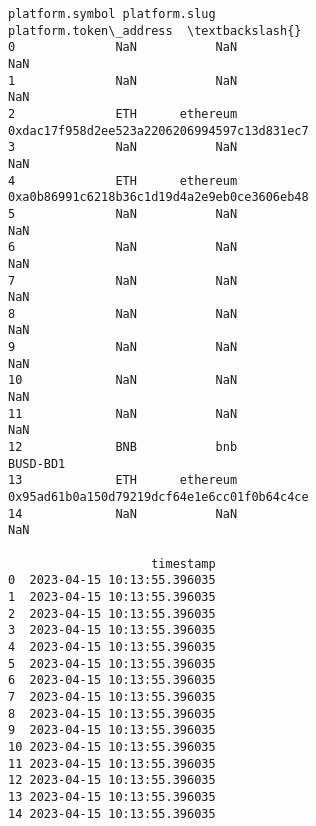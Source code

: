 \documentclass[11pt]{article}
\begin{document}
\begin{tcolorbox}[breakable, size=fbox, boxrule=.5pt, pad at break*=1mm, opacityfill=0]
\begin{Verbatim}[commandchars=\\\{\}]
   platform.symbol platform.slug                      platform.token\_address  \textbackslash{}
0              NaN           NaN                                         NaN
1              NaN           NaN                                         NaN
2              ETH      ethereum  0xdac17f958d2ee523a2206206994597c13d831ec7
3              NaN           NaN                                         NaN
4              ETH      ethereum  0xa0b86991c6218b36c1d19d4a2e9eb0ce3606eb48
5              NaN           NaN                                         NaN
6              NaN           NaN                                         NaN
7              NaN           NaN                                         NaN
8              NaN           NaN                                         NaN
9              NaN           NaN                                         NaN
10             NaN           NaN                                         NaN
11             NaN           NaN                                         NaN
12             BNB           bnb                                    BUSD-BD1
13             ETH      ethereum  0x95ad61b0a150d79219dcf64e1e6cc01f0b64c4ce
14             NaN           NaN                                         NaN

                    timestamp
0  2023-04-15 10:13:55.396035
1  2023-04-15 10:13:55.396035
2  2023-04-15 10:13:55.396035
3  2023-04-15 10:13:55.396035
4  2023-04-15 10:13:55.396035
5  2023-04-15 10:13:55.396035
6  2023-04-15 10:13:55.396035
7  2023-04-15 10:13:55.396035
8  2023-04-15 10:13:55.396035
9  2023-04-15 10:13:55.396035
10 2023-04-15 10:13:55.396035
11 2023-04-15 10:13:55.396035
12 2023-04-15 10:13:55.396035
13 2023-04-15 10:13:55.396035
14 2023-04-15 10:13:55.396035
\end{Verbatim}
\end{tcolorbox}
        
\end{document}
